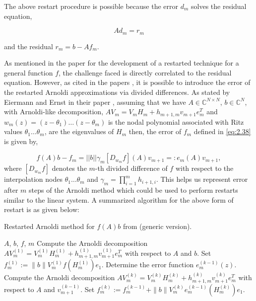 The above restart procedure is possible because the error $d_{m}$ solves the residual equation,

\begin{equation}
    Ad_{m} = r_{m}
    \label{eq:2.39}
\end{equation}

and the residual $r_{m} = b-Af_{m}$.

As mentioned in the paper \cite{52} for the development of a restarted technique for a general function $f$, the challenge faced is directly correlated to the residual equation. However, as cited in the papers \cite{53, 44}, it is possible to introduce the error of the restarted Arnoldi approximations via divided differences. As stated by Eiermann and Ernst in their paper \cite{44}, assuming that we have $A\in\mathbb{C}^{N \times N}$, $b\in\mathbb{C}^{N}$, with Arnoldi-like decomposition, $AV_{m} = V_{m}H_{m}+h_{m+1,m}v_{m+1}e_{m}^{T}$ and $w_{m}(z) = (z-\theta_{1})\dots(z-\theta_{m})$ is the nodal polynomial associated with Ritz values $\theta_{1}\dots\theta_{m}$, are  the eigenvalues of $H_{m}$ then, the error of $f_{m}$ defined in \eqref{eq:2.38} is given by,

\begin{equation}
    f(A)b - f_{m} = ||b|| \gamma_{m} [D_{w_{m}} f](A)v_{m+1} =: e_{m}(A)v_{m+1},
    \label{eq:2.40}
\end{equation}
where $[D_{w_m} f]$ denotes the $m$-th divided difference of $f$ with respect to the interpolation nodes $\theta_{1}\dots\theta_{m}$ and $\gamma_m= \prod_{i=1}^{m}h_{i+1,i}$. This helps us represent error after $m$ steps of the Arnoldi method which could be used to perform restarts similar to the linear system. A summarized algorithm for the above form of restart is as given below:

\begin{algorithm}[H]
    \caption{Restarted Arnoldi method for $f(A)b$ from \cite{52} (generic version).}
    \label{alg:restarted_arnoldi}
    \begin{algorithmic}[1]
    \REQUIRE $A$, $b$, $f$, $m$
    \STATE Compute the Arnoldi decomposition $AV^{(1)}_m = V^{(1)}_m H^{(1)}_m + h^{(1)}_{m+1,m} v^{(1)}_{m+1} e_m^T$ with respect to $A$ and $b$.
    \STATE Set $f^{(1)}_m := \|b\|V^{(1)}_m f(H^{(1)}_m) e_1$.
        \STATE Determine the error function $e^{(k-1)}_m(z)$.
        \STATE Compute the Arnoldi decomposition $AV^{(k)}_m = V^{(k)}_m H^{(k)}_m + h^{(k)}_{m+1,m} v^{(k)}_{m+1} e_m^T$ with respect to $A$ and $v^{(k-1)}_{m+1}$.
        \STATE Set $f^{(k)}_m := f^{(k-1)}_m + \|b\|V^{(k)}_m e^{(k-1)}_m (H^{(k)}_m) e_1$.
    \ENDFOR
    \end{algorithmic}
\end{algorithm}

